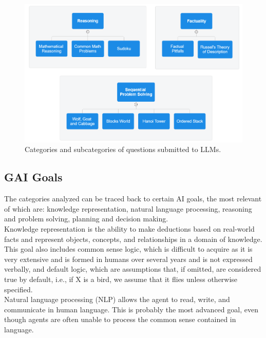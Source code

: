 \documentclass[12pt]{article}
\begin{document}
    \begin{figure}[H]
    \centering
            \includegraphics[width=1\textwidth]{AnalyzedCategory.png}
    \caption[Categories of questions formulated]{Categories and subcategories of questions submitted to LLMs.}
    \label{fig:AnalyzedCategory}
    \end{figure}    
    
    
    \subsection{GAI Goals}
    The categories analyzed can be traced back to certain AI goals, the most relevant of which are: knowledge representation, natural language processing, reasoning and problem solving, planning and decision making.\\
Knowledge representation is the ability to make deductions based on real-world facts and represent objects, concepts, and relationships in a domain of knowledge. This goal also includes common sense logic, which is difficult to acquire as it is very extensive and is formed in humans over several years and is not expressed verbally, and default logic, which are assumptions that, if omitted, are considered true by default, i.e., if X is a bird, we assume that it flies unless otherwise specified.\\
Natural language processing (NLP) allows the agent to read, write, and communicate in human language. This is probably the most advanced goal,\cite{aiindex} even though agents are often unable to process the common sense contained in language.
\end{document}
